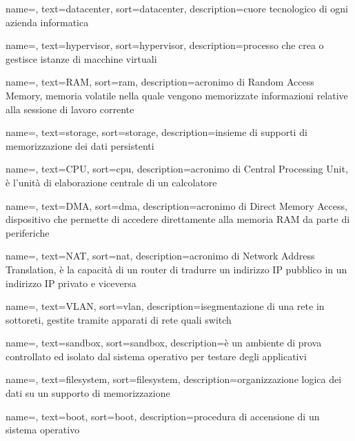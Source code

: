 {
    name=,
    text=datacenter,
    sort=datacenter, 
    description={cuore tecnologico di ogni azienda informatica}
}

{
    name=,
    text=hypervisor,
    sort=hypervisor, 
    description={processo che crea o gestisce istanze di macchine virtuali}
}

{
    name=,
    text=RAM,
    sort=ram, 
    description={acronimo di Random Access Memory, memoria volatile nella quale vengono memorizzate informazioni relative alla sessione di lavoro corrente}
}

{
    name=,
    text=storage,
    sort=storage, 
    description={insieme di supporti di memorizzazione dei dati persistenti}
}

{
    name=,
    text=CPU,
    sort=cpu, 
    description={acronimo di Central Processing Unit, è l'unità di elaborazione centrale di un calcolatore}
}

{
    name=,
    text=DMA,
    sort=dma, 
    description={acronimo di Direct Memory Access, dispositivo che permette di accedere direttamente alla memoria RAM da parte di periferiche}
}

{
    name=,
    text=NAT,
    sort=nat, 
    description={acronimo di Network Address Translation, è la capacità di un router di tradurre un indirizzo IP pubblico in un indirizzo IP privato e viceversa}
}

{
    name=,
    text=VLAN,
    sort=vlan, 
    description={isegmentazione di una rete in sottoreti, gestite tramite apparati di rete quali switch}
}

{
    name=,
    text=sandbox,
    sort=sandbox, 
    description={è un ambiente di prova controllato ed isolato dal sistema operativo per testare degli applicativi}
}

{
    name=,
    text=filesystem,
    sort=filesystem, 
    description={organizzazione logica dei dati su un supporto di memorizzazione}
}

{
    name=,
    text=boot,
    sort=boot, 
    description={procedura di accensione di un sistema operativo}
}

